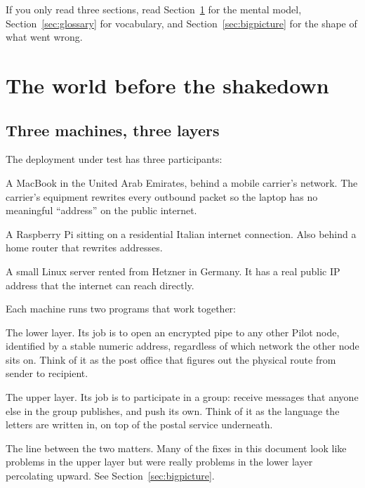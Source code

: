 \documentclass[11pt,a4paper]{article}
\begin{document}
If you only read three sections, read Section~\ref{sec:mental} for
the mental model, Section~\ref{sec:glossary} for vocabulary, and
Section~\ref{sec:bigpicture} for the shape of what went wrong.

\section{The world before the shakedown}
\label{sec:mental}

\subsection{Three machines, three layers}

The deployment under test has three participants:

\begin{description}[leftmargin=1.2em]
    \item[Laptop] A MacBook in the United Arab Emirates, behind a
    mobile carrier's network. The carrier's equipment rewrites
    every outbound packet so the laptop has no meaningful
    ``address'' on the public internet.
    \item[Phobos] A Raspberry Pi sitting on a residential Italian
    internet connection. Also behind a home router that rewrites
    addresses.
    \item[VPS] A small Linux server rented from Hetzner in
    Germany. It has a real public IP address that the internet
    can reach directly.
\end{description}

Each machine runs two programs that work together:

\begin{description}[leftmargin=1.2em]
    \item[\texttt{pilot-daemon}] The lower layer. Its job is to
    open an encrypted pipe to any other Pilot node, identified by
    a stable numeric address, regardless of which network the
    other node sits on. Think of it as the post office that
    figures out the physical route from sender to recipient.
    \item[\texttt{entmootd join}] The upper layer. Its job is to
    participate in a group: receive messages that anyone else in
    the group publishes, and push its own. Think of it as the
    language the letters are written in, on top of the postal
    service underneath.
\end{description}

The line between the two matters. Many of the fixes in this
document look like problems in the upper layer but were really
problems in the lower layer percolating upward. See
Section~\ref{sec:bigpicture}.
\end{document}
